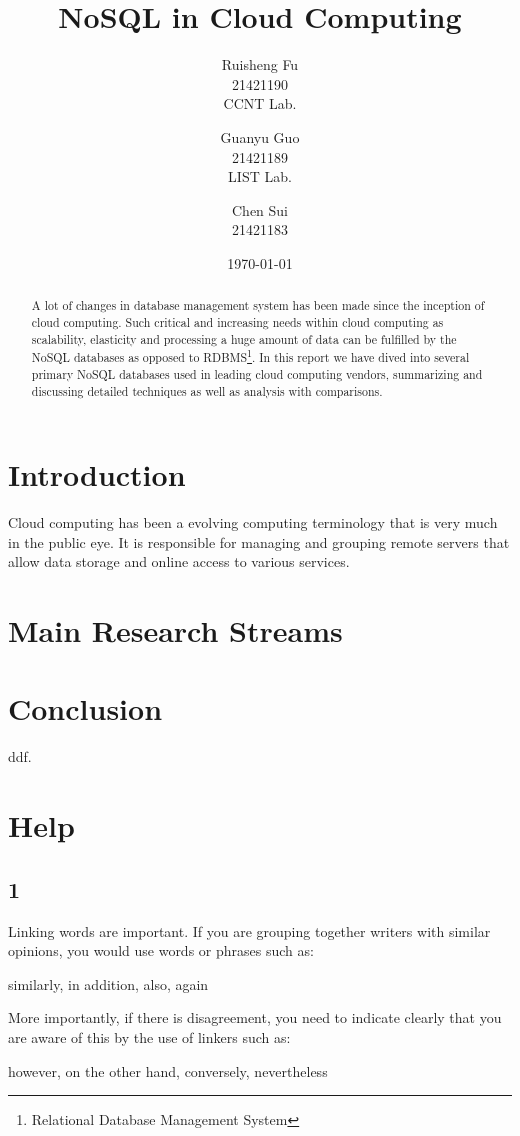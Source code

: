 \documentclass[12pt,letter]{article}
\author{Ruisheng Fu\\21421190\\CCNT Lab.
\and
Guanyu Guo\\21421189\\LIST Lab.
\and
Chen Sui\\21421183}
\title{NoSQL in Cloud Computing}
\date{\today}
\begin{document}
\maketitle
\tableofcontents

\begin{abstract}
A lot of changes in database management system has been made since the inception of cloud computing. Such critical and increasing needs within cloud computing as scalability, elasticity and  processing a huge amount of data can be fulfilled by the NoSQL databases as opposed to RDBMS\footnote{Relational Database Management System}. In this report we have dived into several primary NoSQL databases used in leading cloud computing vendors, summarizing and discussing detailed techniques as well as analysis with comparisons.
\end{abstract}

\section{Introduction}
Cloud computing has been a evolving computing terminology that is very much in the public eye. It is responsible for managing and grouping remote servers that allow data storage and online access to various services. 


\section{Main Research Streams}

\section{Conclusion}
ddf.\cite{Chang2006}
\section{Help}
\subsection{1}
Linking words are important. If you are grouping together writers with similar opinions, you would use words or phrases such as:

similarly, in addition, also, again

More importantly, if there is disagreement, you need to indicate clearly that you are aware of this by the use of linkers such as:

however, on the other hand, conversely, nevertheless
\end{document}
